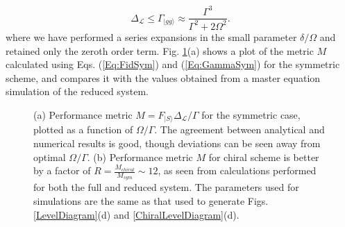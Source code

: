 %
\begin{equation}
    \Delta_{\mathcal{L}} \leq \Gamma_{|gg\rangle} \approx \frac{\Gamma^3}{\Gamma^2 + 2 \Omega^2}.
\label{Eq:GammaSym}
\end{equation}
%
where we have performed a series expansions in the small parameter $\delta/\Omega$ and retained only the zeroth order term. Fig. \ref{fig:Sym_v_Chiral_Timescales}(a) shows a plot of the metric $M$ calculated using Eqs. (\ref{Eq:FidSym}) and (\ref{Eq:GammaSym}) for the symmetric scheme, and compares it with the values obtained from a master equation simulation of the reduced system.
%
\begin{figure}
\caption{(a) Performance metric $M=F_{|S\rangle} \Delta_{\mathcal{L}}/\Gamma$ for the symmetric case, plotted as a function of $\Omega/\Gamma$. The agreement between analytical and numerical results is good, though deviations can be seen away from optimal $\Omega/\Gamma$. (b) Performance metric $M$ for chiral scheme is better by a factor of $R=\frac{M_{chiral}}{M_{sym}}\sim 12$, as seen from calculations performed for both the full and reduced system. The parameters used for simulations are the same as that used to generate Figs. \ref{LevelDiagram}(d) and \ref{ChiralLevelDiagram}(d).}
\label{fig:Sym_v_Chiral_Timescales}
\end{figure}
